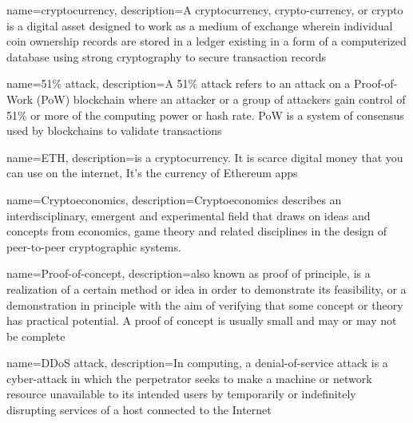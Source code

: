 \makeglossaries
 
{
    name=cryptocurrency,
    description={A cryptocurrency, crypto-currency, or crypto is a digital asset designed to work as a medium of exchange wherein individual coin ownership records are stored in a ledger existing in a form of a computerized database using strong cryptography to secure transaction records}
}

{
    name=51\% attack,
    description={A 51\% attack refers to an attack on a Proof-of-Work (PoW) blockchain where an attacker or a group of attackers gain control of 51\% or more of the computing power or hash rate. PoW is a system of consensus used by blockchains to validate transactions}
}

{
    name=ETH,
    description={is a cryptocurrency. It is scarce digital money that you can use on the internet, It's the currency of Ethereum apps}
}

{
    name=Cryptoeconomics,
    description={Cryptoeconomics describes an interdisciplinary, emergent and experimental field that draws on ideas and concepts from economics, game theory and related disciplines in the design of peer-to-peer cryptographic systems.}
}

{
    name=Proof-of-concept,
    description={also known as proof of principle, is a realization of a certain method or idea in order to demonstrate its feasibility, or a demonstration in principle with the aim of verifying that some concept or theory has practical potential. A proof of concept is usually small and may or may not be complete}
}

{
    name=DDoS attack,
    description={In computing, a denial-of-service attack is a cyber-attack in which the perpetrator seeks to make a machine or network resource unavailable to its intended users by temporarily or indefinitely disrupting services of a host connected to the Internet}
}